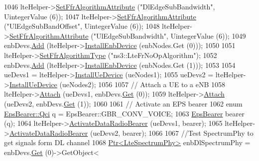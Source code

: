 \begin{DoxyCode}
1046   lteHelper->\hyperlink{classns3_1_1LteHelper_a793d56e843a844428851e90752c5f130}{SetFfrAlgorithmAttribute} (\textcolor{stringliteral}{"DlEdgeSubBandwidth"}, UintegerValue (6));
1047   lteHelper->\hyperlink{classns3_1_1LteHelper_a793d56e843a844428851e90752c5f130}{SetFfrAlgorithmAttribute} (\textcolor{stringliteral}{"UlEdgeSubBandOffset"}, UintegerValue (6));
1048   lteHelper->\hyperlink{classns3_1_1LteHelper_a793d56e843a844428851e90752c5f130}{SetFfrAlgorithmAttribute} (\textcolor{stringliteral}{"UlEdgeSubBandwidth"}, UintegerValue (6));
1049   enbDevs.\hyperlink{classns3_1_1NetDeviceContainer_a7ca8bc1d7ec00fd4fcc63869987fbda5}{Add} (lteHelper->\hyperlink{classns3_1_1LteHelper_a5e009ad35ef85f46b5a6099263f15a03}{InstallEnbDevice} (enbNodes.Get (0)));
1050 
1051   lteHelper->\hyperlink{classns3_1_1LteHelper_a035c6b03305c1511975362f80425b5fc}{SetFfrAlgorithmType} (\textcolor{stringliteral}{"ns3::LteFrNoOpAlgorithm"});
1052   enbDevs.\hyperlink{classns3_1_1NetDeviceContainer_a7ca8bc1d7ec00fd4fcc63869987fbda5}{Add} (lteHelper->\hyperlink{classns3_1_1LteHelper_a5e009ad35ef85f46b5a6099263f15a03}{InstallEnbDevice} (enbNodes.Get (1)));
1053 
1054   ueDevs1 = lteHelper->\hyperlink{classns3_1_1LteHelper_ac9cd932d7de92811cfa953c2e3b2fc9f}{InstallUeDevice} (ueNodes1);
1055   ueDevs2 = lteHelper->\hyperlink{classns3_1_1LteHelper_ac9cd932d7de92811cfa953c2e3b2fc9f}{InstallUeDevice} (ueNodes2);
1056 
1057   \textcolor{comment}{// Attach a UE to a eNB}
1058   lteHelper->\hyperlink{classns3_1_1LteHelper_a9466743f826aa2652a87907b7f0a1c87}{Attach} (ueDevs1, enbDevs.\hyperlink{classns3_1_1NetDeviceContainer_a677d62594b5c9d2dea155cc5045f4d0b}{Get} (0));
1059   lteHelper->\hyperlink{classns3_1_1LteHelper_a9466743f826aa2652a87907b7f0a1c87}{Attach} (ueDevs2, enbDevs.\hyperlink{classns3_1_1NetDeviceContainer_a677d62594b5c9d2dea155cc5045f4d0b}{Get} (1));
1060 
1061   \textcolor{comment}{// Activate an EPS bearer}
1062   \textcolor{keyword}{enum} \hyperlink{structns3_1_1EpsBearer_aecf0c67109c5eb4ec0b07226fff5885e}{EpsBearer::Qci} q = EpsBearer::GBR\_CONV\_VOICE;
1063   \hyperlink{structns3_1_1EpsBearer}{EpsBearer} bearer (q);
1064   lteHelper->\hyperlink{classns3_1_1LteHelper_ac896e16cf162e4beeaa292d39ab1b700}{ActivateDataRadioBearer} (ueDevs1, bearer);
1065   lteHelper->\hyperlink{classns3_1_1LteHelper_ac896e16cf162e4beeaa292d39ab1b700}{ActivateDataRadioBearer} (ueDevs2, bearer);
1066 
1067   \textcolor{comment}{//Test SpectrumPhy to get signals form DL channel}
1068   \hyperlink{classns3_1_1Ptr}{Ptr<LteSpectrumPhy>} enbDlSpectrumPhy = enbDevs.\hyperlink{classns3_1_1NetDeviceContainer_a677d62594b5c9d2dea155cc5045f4d0b}{Get} (0)->GetObject<

\end{DoxyCode}
